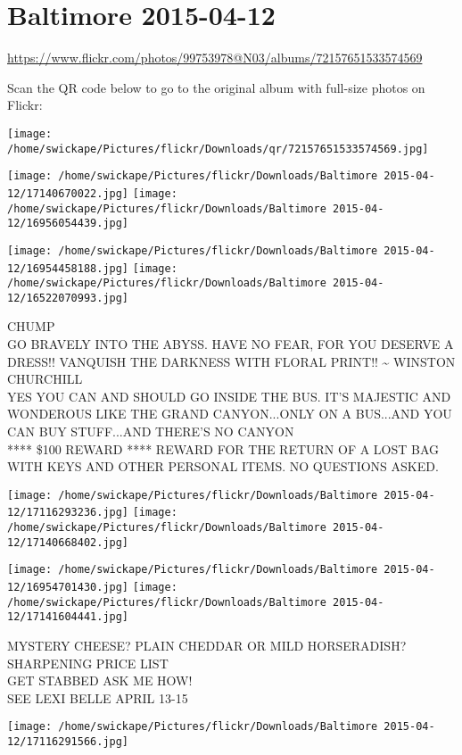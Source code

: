 \documentclass[10pt,letterpaper]{article}
\title{}
\author{}
\date{}
\begin{document}
\section*{Baltimore 2015-04-12}

\url{https://www.flickr.com/photos/99753978@N03/albums/72157651533574569}

Scan the QR code below to go to the original album with full-size photos on Flickr:

\texttt{[image: /home/swickape/Pictures/flickr/Downloads/qr/72157651533574569.jpg]}
\pagebreak

\texttt{[image: /home/swickape/Pictures/flickr/Downloads/Baltimore 2015-04-12/17140670022.jpg]}
\texttt{[image: /home/swickape/Pictures/flickr/Downloads/Baltimore 2015-04-12/16956054439.jpg]}

\texttt{[image: /home/swickape/Pictures/flickr/Downloads/Baltimore 2015-04-12/16954458188.jpg]}
\texttt{[image: /home/swickape/Pictures/flickr/Downloads/Baltimore 2015-04-12/16522070993.jpg]}

CHUMP\\
GO BRAVELY INTO THE ABYSS.  HAVE NO FEAR, FOR YOU DESERVE A DRESS!!  VANQUISH THE DARKNESS WITH FLORAL PRINT!!  \textasciitilde{} WINSTON CHURCHILL\\
YES YOU CAN AND SHOULD GO INSIDE THE BUS.  IT'S MAJESTIC AND WONDEROUS LIKE THE GRAND CANYON...ONLY ON A BUS...AND YOU CAN BUY STUFF...AND THERE'S NO CANYON\\
**** \$100 REWARD **** REWARD FOR THE RETURN OF A LOST BAG WITH KEYS AND OTHER PERSONAL ITEMS.  NO QUESTIONS ASKED.
\pagebreak

\texttt{[image: /home/swickape/Pictures/flickr/Downloads/Baltimore 2015-04-12/17116293236.jpg]}
\texttt{[image: /home/swickape/Pictures/flickr/Downloads/Baltimore 2015-04-12/17140668402.jpg]}

\texttt{[image: /home/swickape/Pictures/flickr/Downloads/Baltimore 2015-04-12/16954701430.jpg]}
\texttt{[image: /home/swickape/Pictures/flickr/Downloads/Baltimore 2015-04-12/17141604441.jpg]}

MYSTERY CHEESE?  PLAIN CHEDDAR OR MILD HORSERADISH?\\
SHARPENING PRICE LIST\\
GET STABBED ASK ME HOW!\\
SEE LEXI BELLE APRIL 13{-}15
\pagebreak

\texttt{[image: /home/swickape/Pictures/flickr/Downloads/Baltimore 2015-04-12/17116291566.jpg]}
\end{document}
